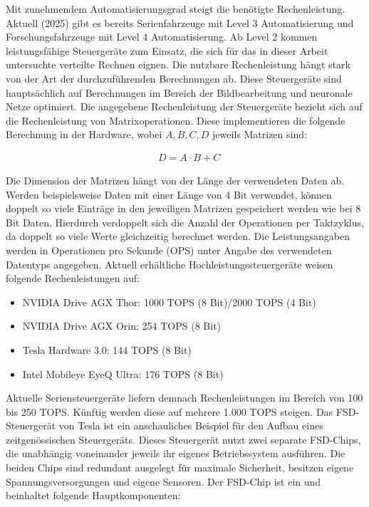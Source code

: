 Mit zunehmendem Automatisierungsgrad steigt die benötigte Rechenleistung. Aktuell (2025) gibt es bereits Serienfahrzeuge mit Level 3 Automatisierung und Forschungsfahrzeuge mit Level 4 Automatisierung. Ab Level 2 kommen leistungsfähige Steuergeräte zum Einsatz, die sich für das in dieser Arbeit untersuchte verteilte Rechnen eignen. Die nutzbare Rechenleistung hängt stark von der Art der durchzuführenden Berechnungen ab. Diese Steuergeräte sind hauptsächlich auf Berechnungen im Bereich der Bildbearbeitung und neuronale Netze optimiert. Die angegebene Rechenleistung der Steuergeräte bezieht sich auf die Rechenleistung von Matrixoperationen. Diese implementieren die folgende Berechnung in der Hardware, wobei $ A, B, C, D $ jeweils Matrizen sind:

\begin{align}
    & D = A  \cdot  B + C
\end{align}

Die Dimension der Matrizen hängt von der Länge der verwendeten Daten ab. Werden beispielsweise Daten mit einer Länge von 4 Bit verwendet, können doppelt so viele Einträge in den jeweiligen Matrizen gespeichert werden wie bei 8 Bit Daten. Hierdurch verdoppelt sich die Anzahl der Operationen per Taktzyklus, da doppelt so viele Werte gleichzeitig berechnet werden. Die Leistungsangaben werden in Operationen pro Sekunde (OPS) unter Angabe des verwendeten Datentyps angegeben. Aktuell erhältliche Hochleistungssteuergeräte weisen folgende Rechenleistungen auf:

\begin{itemize}
	\item NVIDIA Drive AGX Thor: 1000 TOPS (8 Bit)/2000 TOPS (4 Bit) \cite{NVIDIA2025}
	\item NVIDIA Drive AGX Orin: 254 TOPS (8 Bit) \cite{NVIDIA2025}
	\item Tesla Hardware 3.0: 144 TOPS (8 Bit) \cite{Bos2019}
	\item Intel Mobileye EyeQ Ultra: 176 TOPS (8 Bit) \cite{Intel2022}
\end{itemize}

Aktuelle Seriensteuergeräte liefern demnach Rechenleistungen im Bereich von 100 bis 250 TOPS. Künftig werden diese auf mehrere 1.000 TOPS steigen. Das FSD-Steuergerät von Tesla ist ein anschauliches Beispiel für den Aufbau eines zeitgenössischen Steuergeräts. Dieses Steuergerät nutzt zwei separate FSD-Chips, die unabhängig voneinander jeweils ihr eigenes Betriebssystem ausführen. Die beiden Chips sind redundant ausgelegt für maximale Sicherheit, besitzen eigene Spannungsversorgungen und eigene Sensoren. Der FSD-Chip ist ein  und beinhaltet folgende Hauptkomponenten:

